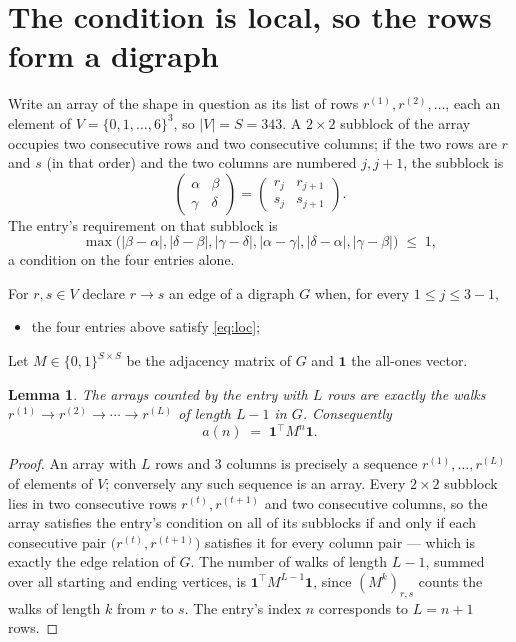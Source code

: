 \documentclass[11pt,a4paper]{article}
\theoremstyle{plain}
\newtheorem{lemma}[theorem]{Lemma}
\theoremstyle{definition}
\begin{document}
\section{The condition is local, so the rows form a digraph}

Write an array of the shape in question as its list of rows
$r^{(1)},r^{(2)},\dots$, each an element of
$V=\{0,1,\dots,6\}^{3}$, so $|V|=S=343$. A $2\times2$ subblock of the array
occupies two consecutive rows and two consecutive columns; if the two rows are $r$
and $s$ (in that order) and the two columns are numbered $j,j+1$,
the subblock is
\[
\begin{pmatrix}\alpha&\beta\\\gamma&\delta\end{pmatrix}=\begin{pmatrix}r_j&r_{j+1}\\s_j&s_{j+1}\end{pmatrix}.
\]
The entry's requirement on that subblock is
\begin{equation}\label{eq:loc}
\max\bigl(|\beta-\alpha|,|\delta-\beta|,|\gamma-\delta|,|\alpha-\gamma|,|\delta-\alpha|,|\gamma-\beta|\bigr)\;\le\;1,
\end{equation}
a condition on the four entries alone.

For $r,s\in V$ declare $r\to s$ an edge of a digraph $G$ when, for every
$1\le j\le 3-1$,
\begin{itemize}
\item the four entries above satisfy \eqref{eq:loc};

\end{itemize}
Let $M\in\{0,1\}^{S\times S}$ be the adjacency matrix of $G$ and $\mathbf{1}$ the
all-ones vector.

\begin{lemma}\label{lem:walk}
The arrays counted by the entry with $L$ rows are exactly the walks
$r^{(1)}\to r^{(2)}\to\cdots\to r^{(L)}$ of length $L-1$ in $G$. Consequently
\[
a(n)\;=\;\mathbf{1}^{\!\top}M^{n}\mathbf{1} .
\]
\end{lemma}

\begin{proof}
An array with $L$ rows and $3$ columns is precisely a sequence
$r^{(1)},\dots,r^{(L)}$ of elements of $V$; conversely any such sequence is an array.
Every $2\times2$ subblock lies in two consecutive rows $r^{(t)},r^{(t+1)}$ and two
consecutive columns, so the array satisfies the entry's condition on all of its subblocks
if and only if each consecutive pair $\bigl(r^{(t)},r^{(t+1)}\bigr)$ satisfies it for
every column pair --- which is exactly the edge relation of $G$. The number of walks of
length $L-1$, summed over all starting and ending vertices, is
$\mathbf{1}^{\!\top}M^{L-1}\mathbf{1}$, since $(M^{k})_{r,s}$ counts the walks of
length $k$ from $r$ to $s$. The entry's index $n$ corresponds to $L=n+1$ rows.
\end{proof}
\end{document}
